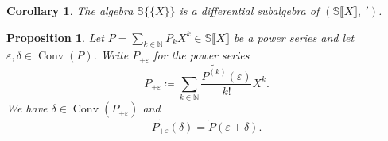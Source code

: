 \documentclass{article}
\newcommand{\assign}{\coloneqq}
\newcommand{\tmop}[1]{\ensuremath{\operatorname{#1}}}
\newtheorem{corollary}[theorem]{Corollary}
\newtheorem{proposition}[theorem]{Proposition}
\theoremstyle{remark}\newtheorem*{convention*}{Convention}
\begin{document}
\begin{corollary}
  The algebra $\mathbb{S} \{ \!\! \{X\} \!\! \}$ is a differential subalgebra
  of $(\mathbb{S} \llbracket X \rrbracket, \mathord{\:'})$.
\end{corollary}

\begin{proposition}
  \label{prop-power-series-translation}Let $P = \sum_{k \in \mathbb{N}} P_k
  X^k \in \mathbb{S} \llbracket X \rrbracket$ be a power series and let
  $\varepsilon, \delta \in \tmop{Conv} (P)$. Write $P_{+ \varepsilon}$ for the
  power series
  \[ P_{+ \varepsilon} \assign \sum_{k \in \mathbb{N}}
     \frac{\widetilde{P^{(k)}} (\varepsilon)}{k!} X^k . \]
  We have $\delta \in \tmop{Conv} (P_{+ \varepsilon})$ and
  \[ \widetilde{P_{+ \varepsilon}} (\delta) = \tilde{P} (\varepsilon + \delta)
     . \]
\end{proposition}
\end{document}

